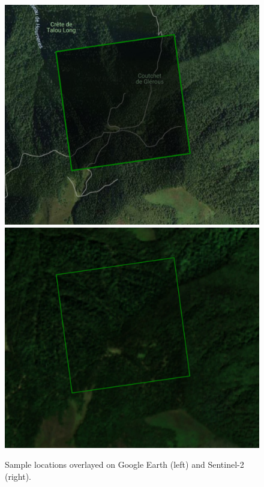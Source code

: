 \begin{figure}[!htb]
    \centering

    \includegraphics[width=0.48\linewidth]{figures_labels/sample_earth.png}
    \includegraphics[width=0.48\linewidth]{figures_labels/sample_sentinel.png}

    \caption{Sample locations overlayed on Google Earth (left) and Sentinel-2 (right).}
    \label{fig:label_sample}
\end{figure}